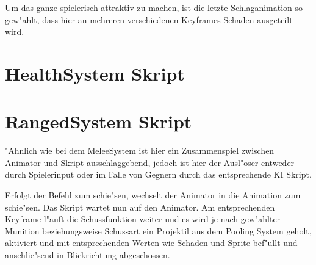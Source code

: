 Um das ganze spielerisch attraktiv zu machen, ist die letzte Schlaganimation so gew"ahlt, dass hier an mehreren verschiedenen Keyframes Schaden ausgeteilt wird.


\section{HealthSystem Skript}

\section{RangedSystem Skript}
"Ahnlich wie bei dem MeleeSystem ist hier ein Zusammenspiel zwischen Animator und Skript ausschlaggebend, jedoch ist hier der Ausl"oser entweder durch Spielerinput oder im Falle von Gegnern durch das entsprechende KI Skript.

Erfolgt der Befehl zum schie"sen, wechselt der Animator in die Animation zum schie"sen. Das Skript wartet nun auf den Animator. Am entsprechenden Keyframe l"auft die Schussfunktion weiter und es wird je nach gew"ahlter Munition beziehungsweise Schussart ein Projektil aus dem Pooling System geholt, aktiviert und mit entsprechenden Werten wie Schaden und Sprite bef"ullt und anschlie"send in Blickrichtung abgeschossen.
